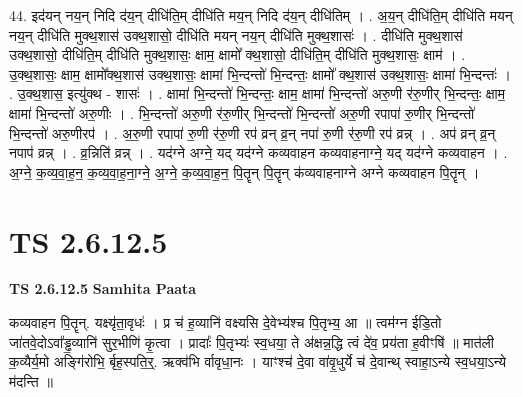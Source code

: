 \documentclass[17pt]{extarticle}
\begin{document}
44. इद॑यन् नय॒न् निदि द॑य॒न् दीधि॑ति॒म् दीधि॑ति मय॒न् निदि द॑य॒न् दीधि॑तिम् । . अ॒य॒न् दीधि॑ति॒म् दीधि॑ति मयन् नय॒न् दीधि॑ति मुक्थ॒शास॑ उक्थ॒शासो॒ दीधि॑ति मयन् नय॒न् दीधि॑ति मुक्थ॒शासः॑ । . दीधि॑ति मुक्थ॒शास॑ उक्थ॒शासो॒ दीधि॑ति॒म् दीधि॑ति मुक्थ॒शासः॒ क्षाम॒ क्षामो᳚ क्थ॒शासो॒ दीधि॑ति॒म् दीधि॑ति मुक्थ॒शासः॒ क्षाम॑ । . उ॒क्थ॒शासः॒ क्षाम॒ क्षामो᳚क्थ॒शास॑ उक्थ॒शासः॒ क्षामा॑ भि॒न्दन्तो॑ भि॒न्दन्तः॒ क्षामो᳚ क्थ॒शास॑ उक्थ॒शासः॒ क्षामा॑ भि॒न्दन्तः॑ । . उ॒क्थ॒शास॒ इत्यु॑क्थ - शासः॑ । . क्षामा॑ भि॒न्दन्तो॑ भि॒न्दन्तः॒ क्षाम॒ क्षामा॑ भि॒न्दन्तो॑ अरु॒णी र॑रु॒णीर् भि॒न्दन्तः॒ क्षाम॒ क्षामा॑ भि॒न्दन्तो॑ अरु॒णीः । . भि॒न्दन्तो॑ अरु॒णी र॑रु॒णीर् भि॒न्दन्तो॑ भि॒न्दन्तो॑ अरु॒णी रपापा॑ रु॒णीर् भि॒न्दन्तो॑ भि॒न्दन्तो॑ अरु॒णीरप॑ । . अ॒रु॒णी रपापा॑ रु॒णी र॑रु॒णी रप॑ व्रन् व्र॒न् नपा॑ रु॒णी र॑रु॒णी रप॑ व्रन्न् । . अप॑ व्रन् व्र॒न् नपाप॑ व्रन्न् । . व्र॒न्निति॑ व्रन्न् । . यद॑ग्ने अग्ने॒ यद् यद॑ग्ने कव्यवाहन कव्यवाहनाग्ने॒ यद् यद॑ग्ने कव्यवाहन । . अ॒ग्ने॒ क॒व्य॒वा॒ह॒न॒ क॒व्य॒वा॒ह॒ना॒ग्ने॒ अ॒ग्ने॒ क॒व्य॒वा॒ह॒न॒ पि॒तॄन् पि॒तॄन् क॑व्यवाहनाग्ने अग्ने कव्यवाहन पि॒तॄन् । \newline
\pagebreak
{}
\section*{ TS 2.6.12.5 }

\textbf{TS 2.6.12.5 } \newline
\textbf{Samhita Paata} \newline

कव्यवाहन पि॒तॄन्. यक्ष्यृ॑ता॒वृधः॑ । प्र च॑ ह॒व्यानि॑ वक्ष्यसि दे॒वेभ्य॑श्च पि॒तृभ्य॒ आ ॥ त्वम॑ग्न ईडि॒तो जा॑तवे॒दोऽवा᳚ड्ढ॒व्यानि॑ सुर॒भीणि॑ कृ॒त्वा । प्रादाः᳚ पि॒तृभ्यः॑ स्व॒धया॒ ते अ॑क्षन्न॒द्धि त्वं दे॑व॒ प्रय॑ता ह॒वीꣳषि॑ ॥ मात॑ली क॒व्यैर्य॒मो अङ्गि॑रोभि॒ र्बृह॒स्पति॒र्॒. ऋक्व॑भि र्वावृधा॒नः । याꣳश्च॑ दे॒वा वा॑वृ॒धुर्ये च॑ दे॒वान्थ् स्वाहा॒ऽन्ये स्व॒धया॒ऽन्ये म॑दन्ति ॥ \newline
\end{document}
